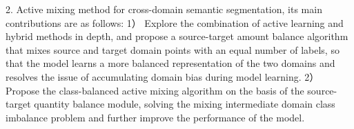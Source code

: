 2. Active mixing method for cross-domain semantic segmentation, its main contributions are as follows:
 1） Explore the combination of active learning and hybrid methods in depth, and propose a source-target amount balance algorithm that mixes source and target domain points with an equal number of labels, so that the model learns a more balanced representation of the two domains and resolves the issue of accumulating domain bias during model learning.
2） Propose the class-balanced active mixing algorithm on the basis of the source-target quantity balance module, solving the mixing intermediate domain class imbalance problem and further improve the performance of the model.

